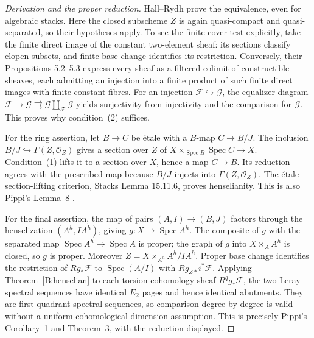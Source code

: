 \begin{proof}[Derivation and the proper reduction]
Hall--Rydh \cite[Proposition 5.4 and Definition 5.5]{BHallRydh2023} prove the equivalence, even for algebraic stacks. Here the closed subscheme $Z$ is again quasi-compact and quasi-separated, so their hypotheses apply. To see the finite-cover test explicitly, take the finite direct image of the constant two-element sheaf: its sections classify clopen subsets, and finite base change identifies its restriction. Conversely, their Propositions 5.2--5.3 express every sheaf as a filtered colimit of constructible sheaves, each admitting an injection into a finite product of such finite direct images with finite constant fibres. For an injection $\mathcal F\hookrightarrow\mathcal G$, the equalizer diagram $\mathcal F\to\mathcal G\rightrightarrows\mathcal G\amalg_{\mathcal F}\mathcal G$ yields surjectivity from injectivity and the comparison for $\mathcal G$. This proves why condition~(2) suffices.

For the ring assertion, let $B\to C$ be \'etale with a $B$-map $C\to B/J$. The inclusion $B/J\hookrightarrow\Gamma(Z,\mathcal O_Z)$ gives a section over $Z$ of $X\times_{\operatorname{Spec}B}\operatorname{Spec}C\to X$. Condition~(1) lifts it to a section over $X$, hence a map $C\to B$. Its reduction agrees with the prescribed map because $B/J$ injects into $\Gamma(Z,\mathcal O_Z)$. The \'etale section-lifting criterion, Stacks Lemma 15.11.6, proves henselianity. This is also Pippi's Lemma~8 \cite{BPippi2017}.

For the final assertion, the map of pairs $(A,I)\to(B,J)$ factors through the henselization $(A^h,IA^h)$, giving $g:X\to\operatorname{Spec}A^h$. The composite of $g$ with the separated map $\operatorname{Spec}A^h\to\operatorname{Spec}A$ is proper; the graph of $g$ into $X\times_A A^h$ is closed, so $g$ is proper. Moreover $Z=X\times_{A^h}A^h/IA^h$. Proper base change identifies the restriction of $Rg_*\mathcal F$ to $\operatorname{Spec}(A/I)$ with $Rg_{Z*}i^*\mathcal F$. Applying Theorem~\ref{B:henselian} to each torsion cohomology sheaf $R^qg_*\mathcal F$, the two Leray spectral sequences have identical $E_2$ pages and hence identical abutments. They are first-quadrant spectral sequences, so comparison degree by degree is valid without a uniform cohomological-dimension assumption. This is precisely Pippi's Corollary~1 and Theorem~3, with the reduction displayed.
\end{proof}

